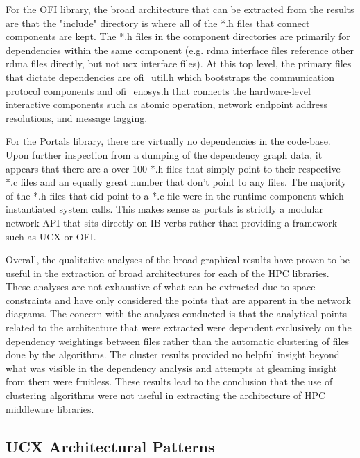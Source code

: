 For the OFI library, the broad architecture that can be extracted from the results are that the "include" directory is where all of the *.h files that connect components are kept. The *.h files in the component directories are primarily for dependencies within the same component (e.g. rdma interface files reference other rdma files directly, but not ucx interface files). At this top level, the primary files that dictate dependencies are ofi\_util.h which bootstraps the communication protocol components and ofi\_enosys.h that connects the hardware-level interactive components such as atomic operation, network endpoint address resolutions, and message tagging.

For the Portals library, there are virtually no dependencies in the code-base. Upon further inspection from a dumping of the dependency graph data, it appears that there are a over 100 *.h files that simply point to their respective *.c files and an equally great number that don't point to any files. The majority of the *.h files that did point to a *.c file were in the runtime component which instantiated system calls. This makes sense as portals is strictly a modular network API that sits directly on IB verbs rather than providing a framework such as UCX or OFI.

Overall, the qualitative analyses of the broad graphical results have proven to be useful in the extraction of broad architectures for each of the HPC libraries. These analyses are not exhaustive of what can be extracted due to space constraints and have only considered the points that are apparent in the network diagrams. The concern with the analyses conducted is that the analytical points related to the architecture that were extracted were dependent exclusively on the dependency weightings between files rather than the automatic clustering of files done by the algorithms. The cluster results provided no helpful insight beyond what was visible in the dependency analysis and attempts at gleaming insight from them were fruitless. These results lead to the conclusion that the use of clustering algorithms were not useful in extracting the architecture of HPC middleware libraries.

\subsection{UCX Architectural Patterns}
\label{subsec:ucx_arch}

